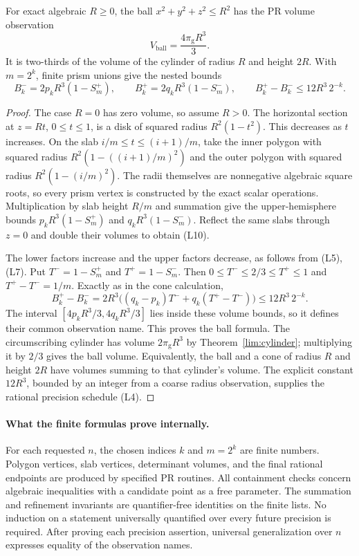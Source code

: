 \begin{theorem}
\label{lim:sphere}
For exact algebraic $R\ge0$, the ball
$x^2+y^2+z^2\le R^2$ has the PR volume observation
\[
 V_{\mathrm{ball}}=\frac{4\pi_{\mathrm g}R^3}{3}.
\]
It is two-thirds of the volume of the cylinder of radius $R$ and height
$2R$. With $m=2^k$, finite prism unions give the nested bounds
\[
 B_k^-=2p_kR^3(1-S_m^+),\qquad
 B_k^+=2q_kR^3(1-S_m^-),\qquad
 B_k^+-B_k^-\le12R^3\,2^{-k}.                        \tag{L10}
\]
\end{theorem}
\begin{proof}
The case $R=0$ has zero volume, so assume $R>0$.
The horizontal section at $z=Rt$, $0\le t\le1$, is a disk of squared
radius $R^2(1-t^2)$. This decreases as $t$ increases.
On the slab $i/m\le t\le(i+1)/m$, take the inner polygon with squared
radius $R^2(1-((i+1)/m)^2)$ and the outer polygon with squared radius
$R^2(1-(i/m)^2)$. The radii themselves are nonnegative algebraic
square roots, so every prism vertex is constructed by the exact scalar
operations. Multiplication by slab height $R/m$ and summation give
the upper-hemisphere bounds
$p_kR^3(1-S_m^+)$ and $q_kR^3(1-S_m^-)$.
Reflect the same slabs through $z=0$ and double their volumes to obtain
(L10).

The lower factors increase and the upper factors decrease, as follows
from (L5), (L7). Put $T^-=1-S_m^+$ and $T^+=1-S_m^-$.
Then $0\le T^-\le2/3\le T^+\le1$ and $T^+-T^-=1/m$.
Exactly as in the cone calculation,
\[
 B_k^+-B_k^-
 =2R^3\bigl((q_k-p_k)T^-+q_k(T^+-T^-)\bigr)
 \le12R^3\,2^{-k}.
\]
The interval $[4p_kR^3/3,4q_kR^3/3]$ lies inside these volume bounds,
so it defines their common observation name. This proves the ball
formula. The circumscribing cylinder has volume
$2\pi_{\mathrm g}R^3$ by Theorem~\ref{lim:cylinder}; multiplying it by
$2/3$ gives the ball volume. Equivalently, the ball and a cone of radius
$R$ and height $2R$ have volumes summing to that cylinder's volume.
The explicit constant $12R^3$, bounded by an integer from a coarse
radius observation, supplies the rational precision schedule (L4).
\end{proof}

\paragraph{What the finite formulas prove internally.}
For each requested $n$, the chosen indices $k$ and $m=2^k$ are finite
numbers. Polygon vertices, slab vertices, determinant volumes, and the
final rational endpoints are produced by specified PR routines.
All containment checks concern algebraic inequalities with a candidate
point as a free parameter. The summation and refinement invariants are
quantifier-free identities on the finite lists. No induction on a
statement universally quantified over every future precision is required.
After proving each precision assertion, universal generalization over
$n$ expresses equality of the observation names.

